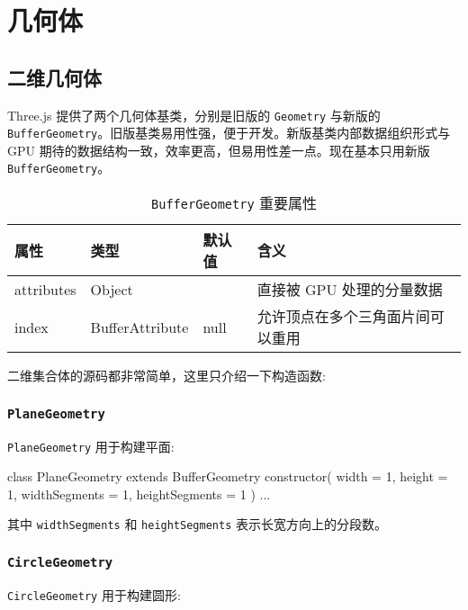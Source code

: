 \section{几何体}

\subsection{二维几何体}

Three.js 提供了两个几何体基类，分别是旧版的 \texttt{Geometry} 与新版的 \texttt{BufferGeometry}。旧版基类易用性强，便于开发。新版基类内部数据组织形式与 GPU 期待的数据结构一致，效率更高，但易用性差一点。现在基本只用新版 \texttt{BufferGeometry}。

\begin{table}[H]
  \centering
  \small
  \caption{\texttt{BufferGeometry} 重要属性}
  \setlength{\tabcolsep}{4mm}
  \begin{tabular}{l|l|l|l}
    \toprule
    \textbf{属性} & \textbf{类型} & \textbf{默认值} & \textbf{含义} \\
    \midrule
    attributes & Object & {} & 直接被 GPU 处理的分量数据 \\
    index & BufferAttribute & null & 允许顶点在多个三角面片间可以重用 \\
    \bottomrule
  \end{tabular}
\end{table}

二维集合体的源码都非常简单，这里只介绍一下构造函数:

\subsubsection*{\texttt{PlaneGeometry}}

\texttt{PlaneGeometry} 用于构建平面:

\begin{JavaScript}
class PlaneGeometry extends BufferGeometry {
	constructor( width = 1, height = 1, widthSegments = 1, heightSegments = 1 )
  ...
}
\end{JavaScript}

其中 \texttt{widthSegments} 和 \texttt{heightSegments} 表示长宽方向上的分段数。

\subsubsection*{\texttt{CircleGeometry}}

\texttt{CircleGeometry} 用于构建圆形:

